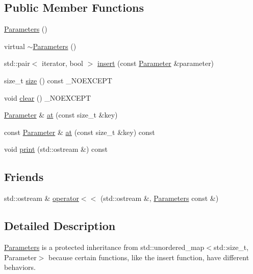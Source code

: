 \subsection*{Public Member Functions}
\begin{DoxyCompactItemize}
\item 
\mbox{\hyperlink{class_parameters_af4d94ee360ac0157d9065f78797fe9a1}{Parameters}} ()
\item 
virtual \mbox{\hyperlink{class_parameters_a640a1a349975a8cb023696f25e563a5c}{$\sim$\+Parameters}} ()
\item 
std\+::pair$<$ iterator, bool $>$ \mbox{\hyperlink{class_parameters_ab643a6115d93d3142247f4a3ecf79d59}{insert}} (const \mbox{\hyperlink{class_parameter}{Parameter}} \&parameter)
\item 
size\+\_\+t \mbox{\hyperlink{class_parameters_a93bcd325ff5cca516148fe89fe3d1bc0}{size}} () const \+\_\+\+N\+O\+E\+X\+C\+E\+PT
\item 
void \mbox{\hyperlink{class_parameters_aa28dc24da9d17a3c83069b3817246f8c}{clear}} () \+\_\+\+N\+O\+E\+X\+C\+E\+PT
\item 
\mbox{\hyperlink{class_parameter}{Parameter}} \& \mbox{\hyperlink{class_parameters_a719a79f29caa1c2adeee85ab8a963f40}{at}} (const size\+\_\+t \&key)
\item 
const \mbox{\hyperlink{class_parameter}{Parameter}} \& \mbox{\hyperlink{class_parameters_aa52d49e7e5d0e112a90a3cd288c477ce}{at}} (const size\+\_\+t \&key) const
\item 
void \mbox{\hyperlink{class_parameters_adff840358049658c4bb93c2b17480e74}{print}} (std\+::ostream \&) const
\end{DoxyCompactItemize}
\subsection*{Friends}
\begin{DoxyCompactItemize}
\item 
std\+::ostream \& \mbox{\hyperlink{class_parameters_a8ffabb0f94a5698a8a711fa5c449e622}{operator$<$$<$}} (std\+::ostream \&, \mbox{\hyperlink{class_parameters}{Parameters}} const \&)
\end{DoxyCompactItemize}


\subsection{Detailed Description}
\mbox{\hyperlink{class_parameters}{Parameters}} is a protected inheritance from std\+::unordered\+\_\+map$<$std\+::size\+\_\+t, Parameter$>$ because certain functions, like the insert function, have different behaviors. 

